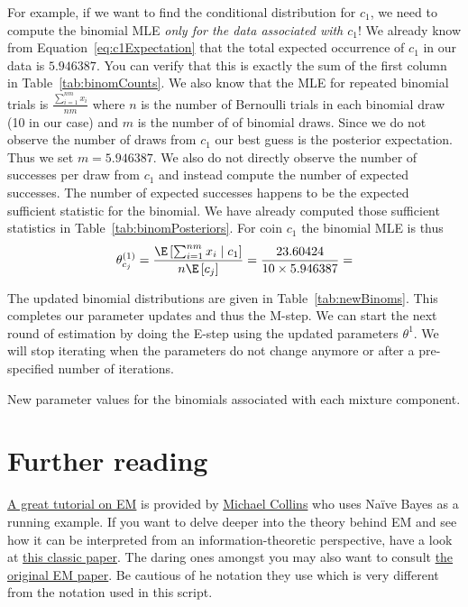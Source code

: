 For example, if we want to find the conditional distribution for $ c_{1} $, we need to compute the binomial MLE \textit{only
for the data associated with $ c_{1} $}! We already know from Equation~\eqref{eq:c1Expectation} that the total expected 
occurrence of $ c_{1} $ in our data is $ 5.946387 $. You can verify that this is exactly the sum of the first column in
Table~\ref{tab:binomCounts}. We also know that the MLE for repeated binomial trials is $ \frac{\sum^{nm}_{i=1}x_{i}}{nm} $ where
$ n $ is the number of Bernoulli trials in each binomial draw (10 in our case) and $ m $ is the number of of binomial draws. Since we do
not observe the number of draws from $ c_{1} $ our best guess is the posterior expectation. Thus we set $ m = 5.946387 $. We also do not
directly observe the number of successes per draw from $ c_{1} $ and instead compute the number of expected successes. The number of 
expected successes happens to be the expected sufficient statistic for the binomial. We have already computed those sufficient statistics
in Table~\ref{tab:binomPosteriors}. For coin $ c_{1} $ the binomial MLE is thus
\begin{equation}
\theta_{c_{j}}^{(1)} =  \frac{\E\left[\sum_{i=1}^{nm} x_{i}\mid c_{1}\right]}{n\E\left[c_{j}\right]} = \frac{23.60424}{10 \times 5.946387}
= 
\end{equation}

The updated binomial distributions are given in Table~\ref{tab:newBinoms}. This completes our parameter
updates and thus the M-step. We can start the next round of estimation by doing the E-step using the
updated parameters $ \theta^{1} $. We will stop iterating when the parameters do not change anymore or
after a pre-specified number of iterations.

\begin{table}
\center
\begin{kframe}


{\ttfamily\noindent\bfseries{}}\end{kframe}
\caption{New parameter values for the binomials associated with each mixture component.}
\label{tab:newBinoms}
\end{table}

\section*{Further reading}
\href{http://www.cs.columbia.edu/~mcollins/em.pdf}{A great tutorial on EM} is provided by \href{http://www.cs.columbia.edu/~mcollins/}{Michael Collins} who
uses Na\"ive Bayes as a running example. If you want to delve deeper into the theory behind EM and see how it can be interpreted from an information-theoretic
perspective, have a look at \href{http://www.cs.toronto.edu/~fritz/absps/emk.pdf}{this classic paper}. The daring ones amongst you may also want to consult
\href{http://web.mit.edu/6.435/www/Dempster77.pdf}{the original EM paper}. Be cautious of he notation they use which is very different from the notation
used in this script.


